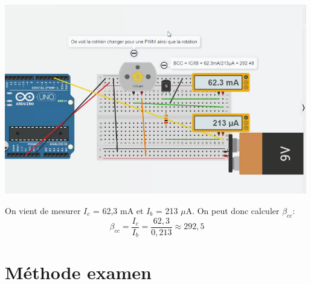\documentclass[a4paper]{article}
\begin{document}
\begin{center}
    \includegraphics[width=0.99\textwidth]{images/calcul-beta-cc.PNG}
\end{center}

On vient de mesurer $ I_c $ = 62,3 mA et $ I_b $ = 213 $ \mu $A. On peut donc calculer $ \beta_{cc} $:
\[ \beta_{cc} = \frac{I_c}{I_b} = \frac{62,3}{0,213} \approx 292,5 \]















\newpage \section{Méthode examen}
\end{document}
